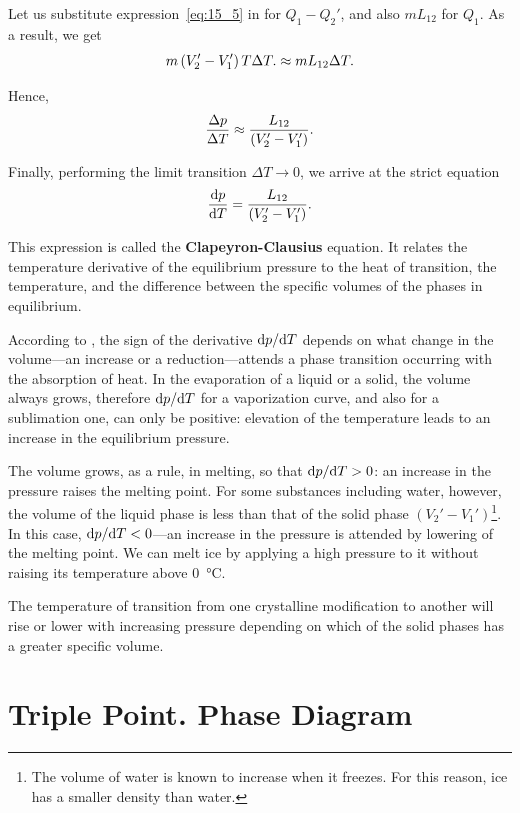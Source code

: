 Let us substitute expression~\eqref{eq:15_5} in  for $Q_1-Q_2'$, and also $mL_{12}$ for $Q_1$. As a result, we get
\begin{equation*}
    m\left(V_2'-V_1'\right) T \Delta T. \approx mL_{12} \Delta T.
\end{equation*}

\noindent
Hence,
\begin{equation*}
    \frac{\Delta p}{\Delta T} \approx \frac{L_{12}}{\left(V_2'-V_1'\right)}.
\end{equation*}

\noindent
Finally, performing the limit transition $\Delta T\to 0$, we arrive at the strict equation
\begin{equation}\label{eq:15_6}
    \frac{\mathrm{d} p}{\mathrm{d} T} = \frac{L_{12}}{\left(V_2'-V_1'\right)}.
\end{equation}

\noindent
This expression is called the \textbf{Clapeyron-Clausius} equation. It relates the temperature derivative of the equilibrium pressure to the heat of transition, the temperature, and the difference between the specific volumes of the phases in equilibrium.

According to , the sign of the derivative $\mathrm{d} p/\mathrm{d} T$ depends on what change in the volume---an increase or a reduction---attends a phase transition occurring with the absorption of heat. In the evaporation of a liquid or a solid, the volume always grows, therefore $\mathrm{d} p/\mathrm{d} T$ for a vaporization curve, and also for a sublimation one, can only be positive: elevation of the temperature leads to an increase in the equilibrium pressure.

The volume grows, as a rule, in melting, so that $\mathrm{d} p/\mathrm{d} T>0$: an increase in the pressure raises the melting point. For some substances including water, however, the volume of the liquid phase is less than that of the solid phase $(V_2'-V_1')$\footnote{The volume of water is known to increase when it freezes. For this reason, ice has a smaller density than water.}. In this case, $\mathrm{d} p/\mathrm{d} T<0$---an increase in the pressure is attended by lowering of the melting point. We can melt ice by applying a high pressure to it without raising its temperature above \SI{0}{\degreeCelsius}.

The temperature of transition from one crystalline modification to another will rise or lower with increasing pressure depending on which of the solid phases has a greater specific volume.

\section{Triple Point. Phase Diagram}\label{sec:15_8}

